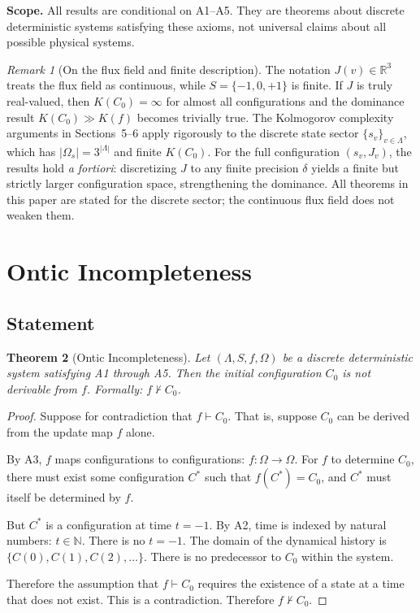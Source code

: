 \documentclass[12pt]{article}
\theoremstyle{plain}
\newtheorem{theorem}{Theorem}[section]
\theoremstyle{definition}
\theoremstyle{remark}
\newtheorem{remark}[theorem]{Remark}
\newcommand{\Lattice}{\Lambda}
\newcommand{\Real}{\mathbb{R}}
\newcommand{\Natural}{\mathbb{N}}
\begin{document}
\noindent\textbf{Scope.} All results are conditional on A1--A5. They are theorems about discrete deterministic systems satisfying these axioms, not universal claims about all possible physical systems.

\begin{remark}[On the flux field and finite description]\label{rem:flux}
The notation $J(v) \in \Real^3$ treats the flux field as continuous, while $S = \{-1, 0, +1\}$ is finite. If $J$ is truly real-valued, then $K(C_0) = \infty$ for almost all configurations and the dominance result $K(C_0) \gg K(f)$ becomes trivially true. The Kolmogorov complexity arguments in Sections~5--6 apply rigorously to the discrete state sector $\{s_v\}_{v \in \Lattice}$, which has $|\Omega_s| = 3^{|\Lattice|}$ and finite $K(C_0)$. For the full configuration $(s_v, J_v)$, the results hold \emph{a fortiori}: discretizing $J$ to any finite precision $\delta$ yields a finite but strictly larger configuration space, strengthening the dominance. All theorems in this paper are stated for the discrete sector; the continuous flux field does not weaken them.
\end{remark}


\section{Ontic Incompleteness}

\subsection{Statement}

\begin{theorem}[Ontic Incompleteness]\label{thm:incompleteness}
Let $(\Lattice, S, f, \Omega)$ be a discrete deterministic system satisfying A1 through A5. Then the initial configuration $C_0$ is not derivable from $f$. Formally: $f \nvdash C_0$.
\end{theorem}

\begin{proof}
Suppose for contradiction that $f \vdash C_0$. That is, suppose $C_0$ can be derived from the update map $f$ alone.

By A3, $f$ maps configurations to configurations: $f \colon \Omega \to \Omega$. For $f$ to determine $C_0$, there must exist some configuration $C^*$ such that $f(C^*) = C_0$, and $C^*$ must itself be determined by $f$.

But $C^*$ is a configuration at time $t = -1$. By A2, time is indexed by natural numbers: $t \in \Natural$. There is no $t = -1$. The domain of the dynamical history is $\{C(0), C(1), C(2), \ldots\}$. There is no predecessor to $C_0$ within the system.

Therefore the assumption that $f \vdash C_0$ requires the existence of a state at a time that does not exist. This is a contradiction. Therefore $f \nvdash C_0$.
\end{proof}
\end{document}
